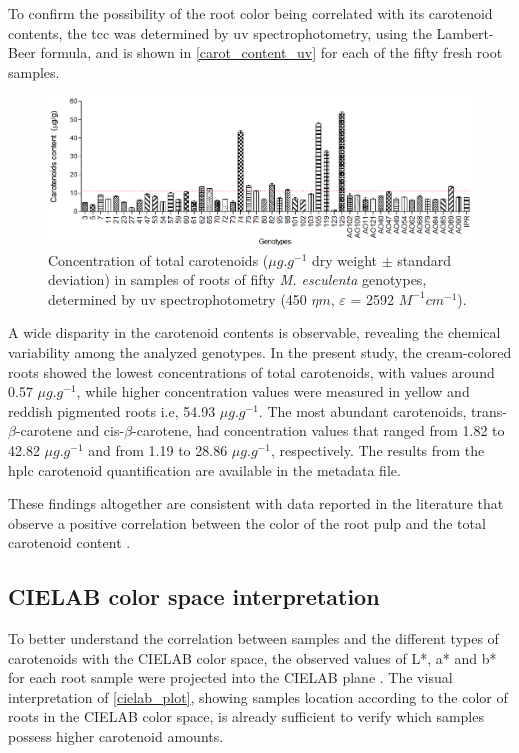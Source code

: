 To confirm the possibility of the root color being correlated with its carotenoid contents, the \gls{tcc} was determined by \gls{uv} spectrophotometry, using the Lambert-Beer formula, and is shown in \autoref{carot_content_uv} for each of the fifty fresh root samples.

\begin{figure}[h]
	\centering
	\includegraphics[width=1\linewidth]{Imagens/Case_study/carot_content_uv}
	\caption{Concentration of total carotenoids ($\mu g.g^{-1}$ dry weight $\pm$ standard deviation) in samples of roots of fifty \textit{M. esculenta} genotypes, determined by \gls{uv} spectrophotometry (450 $\eta m$, $\varepsilon$ = 2592 $M^{-1} cm^{-1}$).}
	\label{carot_content_uv}
\end{figure}

A wide disparity in the carotenoid contents is observable, revealing the chemical variability among the analyzed genotypes. In the present study, the cream-colored roots showed the lowest concentrations of total carotenoids, with values around 0.57 $\mu g.g^{-1}$, while higher concentration values were measured in yellow and reddish pigmented roots i.e, 54.93 $\mu g.g^{-1}$. The most abundant carotenoids, trans-$\beta$-carotene and cis-$\beta$-carotene, had concentration values that ranged from 1.82 to 42.82 $\mu g.g^{-1}$ and from 1.19 to 28.86 $\mu g.g^{-1}$, respectively. The results from the \gls{hplc} carotenoid quantification are available in the metadata file.

These findings altogether are consistent with data reported in the literature that observe a positive correlation between the color of the root pulp and the total carotenoid content \citep{champagne2010carotenoid, chavez2005variation, iglesias1997genetic}.


\subsection{CIELAB color space interpretation} \label{cielab_subsec}

To better understand the correlation between samples and the different types of carotenoids with the CIELAB color space, the observed values of L*, a* and b* for each root sample were projected into the CIELAB plane \citep{kljak2014reflectance}. 
The visual interpretation of \autoref{cielab_plot}, showing samples location according to the color of roots in the CIELAB color space, is already sufficient to verify which samples possess higher carotenoid amounts.


